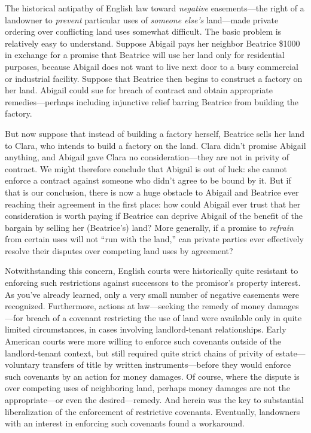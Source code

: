 
The historical antipathy of English law toward \textit{negative} easements---the
right of a landowner to \textit{prevent} particular uses of \textit{someone
else's} land---made private ordering over conflicting land uses somewhat
difficult. The basic problem is relatively easy to understand. Suppose Abigail
pays her neighbor Beatrice \$1000 in exchange for a promise that Beatrice will
use her land only for residential purposes, because Abigail does not want to
live next door to a busy commercial or industrial facility. Suppose that
Beatrice then begins to construct a factory on her land. Abigail could sue for
breach of contract and obtain appropriate remedies---perhaps including
injunctive relief barring Beatrice from building the factory.

But now suppose that instead of building a factory herself, Beatrice sells her
land to Clara, who intends to build a factory on the land. Clara didn't promise
Abigail anything, and Abigail gave Clara no consideration---they are not in
privity of contract. We might therefore conclude that Abigail is out of luck:
she cannot enforce a contract against someone who didn't agree to be bound by
it. But if that is our conclusion, there is now a huge obstacle to Abigail and
Beatrice ever reaching their agreement in the first place: how could Abigail
ever trust that her consideration is worth paying if Beatrice can deprive
Abigail of the benefit of the bargain by selling her (Beatrice's) land? More
generally, if a promise to \textit{refrain} from certain uses will not ``run
with the land,'' can private parties ever effectively resolve their disputes
over competing land uses by agreement?

Notwithstanding this concern, English courts were historically quite resistant
to enforcing such restrictions against successors to the promisor's property
interest. As you've already learned, only a very small number of negative
easements were recognized. Furthermore, actions at law---seeking the remedy of
money damages---for breach of a covenant restricting the use of land were
available only in quite limited circumstances, in cases involving
landlord-tenant relationships. Early American courts were more willing to
enforce such covenants outside of the landlord-tenant context, but still
required quite strict chains of privity of estate---voluntary transfers of title
by written instruments---before they would enforce such covenants by an action
for money damages. Of course, where the dispute is over competing uses of
neighboring land, perhaps money damages are not the appropriate---or even the
desired---remedy. And herein was the key to substantial liberalization of the
enforcement of restrictive covenants. Eventually, landowners with an interest in
enforcing such covenants found a workaround.


